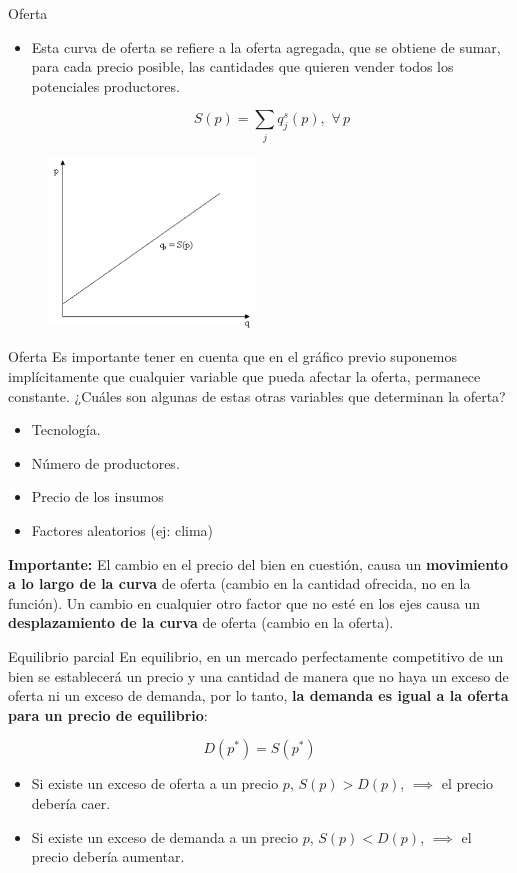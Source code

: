 \documentclass{beamer}
\begin{document}
\begin{frame}{Oferta}
    \begin{itemize}
        \item Esta curva de oferta se refiere a la oferta agregada, que se obtiene de sumar, para cada precio posible, las cantidades que quieren vender todos los potenciales productores.
        
        \[S(p) = \sum_{j}q_{j}^{s}(p), \,\, \forall \, p
        \]
    \end{itemize}
    
\begin{figure}
\includegraphics[width=5.5cm]{figures1/supply.png}
\end{figure}
\end{frame}

\begin{frame}{Oferta}
Es importante tener en cuenta que en el gráfico previo suponemos implícitamente que cualquier variable que pueda afectar la oferta, permanece constante. ¿Cuáles son algunas de estas otras variables que
determinan la oferta?
\begin{itemize}
    \item Tecnología.
    \item Número de productores.
    \item Precio de los insumos 
    \item Factores aleatorios (ej: clima)
\end{itemize}
\textbf{Importante:} El cambio en el precio del bien en cuestión, causa un
\textbf{movimiento a lo largo de la curva} de oferta (cambio en la cantidad ofrecida, no en la función). Un cambio en cualquier otro factor que no esté en los ejes causa un \textbf{desplazamiento de la curva} de oferta (cambio en la oferta).
\end{frame}

\begin{frame}{Equilibrio parcial}
En equilibrio, en un mercado perfectamente competitivo de un bien se establecerá un precio
y una cantidad de manera que no haya un exceso de oferta ni un exceso de
demanda, por lo tanto, \textbf{la demanda es igual a la oferta para un precio de equilibrio}:

\[
D(p^*) = S(p^*)
\]

\begin{itemize}
    \item Si existe un exceso de oferta a un precio $p$, $S(p)>D(p)$, $\implies$ el precio debería caer.
    \item Si existe un exceso de demanda a un precio $p$, $S(p)<D(p)$, $\implies$ el precio debería aumentar.
\end{itemize}
\end{frame}
\end{document}
